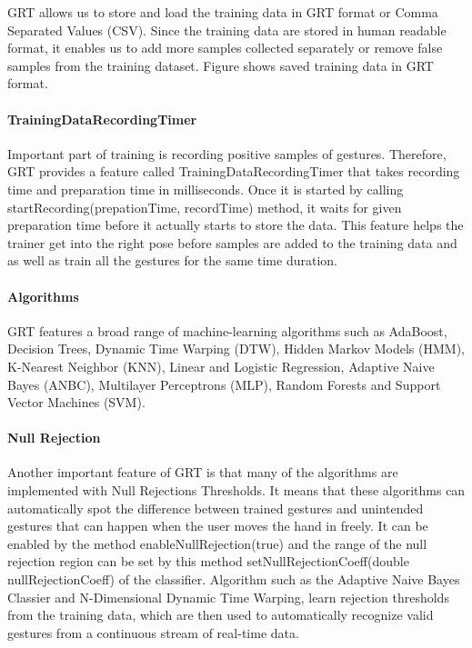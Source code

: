 GRT allows us to store and load the training data in GRT format or Comma Separated Values (CSV). Since the training data are stored in human readable format, it enables us to add more samples collected separately or remove false samples from the training dataset. Figure shows saved training data in GRT format.

\paragraph*{TrainingDataRecordingTimer} Important part of training is recording positive samples of gestures. Therefore, GRT provides a feature called TrainingDataRecordingTimer that takes recording time and preparation time in milliseconds. Once it is started by calling startRecording(prepationTime, recordTime) method, it waits for given preparation time before it actually starts to store the data. This feature helps the trainer get into the right pose before samples are added to the training data and as well as train all the gestures for the same time duration.

\paragraph*{Algorithms} GRT features a broad range of machine-learning algorithms such as AdaBoost, Decision Trees, Dynamic Time Warping (DTW), Hidden Markov Models (HMM), K-Nearest Neighbor (KNN), Linear and Logistic Regression, Adaptive Naive Bayes (ANBC), Multilayer Perceptrons (MLP), Random Forests and Support Vector Machines (SVM). 

\paragraph*{Null Rejection} Another important feature of GRT is that many of the algorithms are implemented with Null Rejections Thresholds. It means that these algorithms can automatically spot the difference between trained gestures and unintended gestures that can happen when the user moves the hand in freely. It can be enabled by the method enableNullRejection(true) and the range of the null rejection region can be set by this method setNullRejectionCoeff(double nullRejectionCoeff) of the classifier. Algorithm such as the Adaptive Naive Bayes Classier and N-Dimensional Dynamic Time Warping, learn rejection thresholds from the training data, which are then used to automatically recognize valid gestures from a continuous stream of real-time data.

